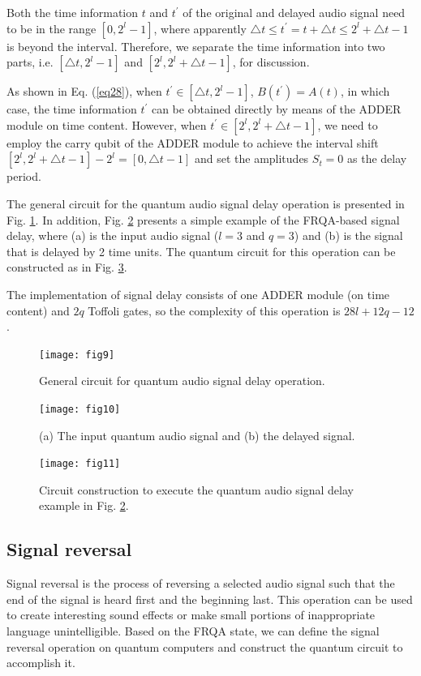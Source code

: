 \documentclass[10pt,journal,compsoc]{IEEEtran}
\begin{document}
Both the time information $t$ and $t^{\prime}$ of the original and delayed audio signal need to be in the range $[0, 2^l - 1]$, where apparently $\triangle{t} \leq t^{\prime} = t + \triangle{t} \leq 2^l + \triangle{t} - 1$ is beyond the interval. Therefore, we separate the time information into two parts, i.e. $[\triangle{t}, 2^l - 1]$ and $[2^l, 2^l + \triangle{t} - 1]$, for discussion.

As shown in Eq. (\ref{eq28}), when $t^{\prime} \in [\triangle{t}, 2^l - 1]$, $B(t^{\prime}) = A(t)$, in which case, the time information $t^{\prime}$ can be obtained directly by means of the ADDER module on time content. However, when $t^{\prime} \in [2^l, 2^l + \triangle{t} - 1]$, we need to employ the carry qubit of the ADDER module to achieve the interval shift $[2^l, 2^l + \triangle{t} - 1] - 2^l = [0, \triangle{t}-1]$ and set the amplitudes $S_t = 0$ as the delay period.

The general circuit for the quantum audio signal delay operation is presented in Fig. \ref{fig9}. In addition, Fig. \ref{fig10} presents a simple example of the FRQA-based signal delay, where (a) is the input audio signal ($l = 3$ and $q = 3$) and (b) is the signal that is delayed by 2 time units. The quantum circuit for this operation can be constructed as in Fig. \ref{fig11}.

The implementation of signal delay consists of one ADDER module (on time content) and $2q$ Toffoli gates, so the complexity of this operation is $28l + 12q - 12$.

\begin{figure}[!t]
\centering
\texttt{[image: fig9]}
\caption{General circuit for quantum audio signal delay operation.}
\label{fig9}
\end{figure}

\begin{figure}[!t]
\centering
\texttt{[image: fig10]}
\caption{(a) The input quantum audio signal and (b) the delayed signal.}
\label{fig10}
\end{figure}

\begin{figure}[!t]
\centering
\texttt{[image: fig11]}
\caption{Circuit construction to execute the quantum audio signal delay example in Fig. \ref{fig10}.}
\label{fig11}
\end{figure}

\subsection{Signal reversal}\label{sec3-4}
Signal reversal is the process of reversing a selected audio signal such that the end of the signal is heard first and the beginning last. This operation can be used to create interesting sound effects or make small portions of inappropriate language unintelligible. Based on the FRQA state, we can define the signal reversal operation on quantum computers and construct the quantum circuit to accomplish it.
\end{document}
